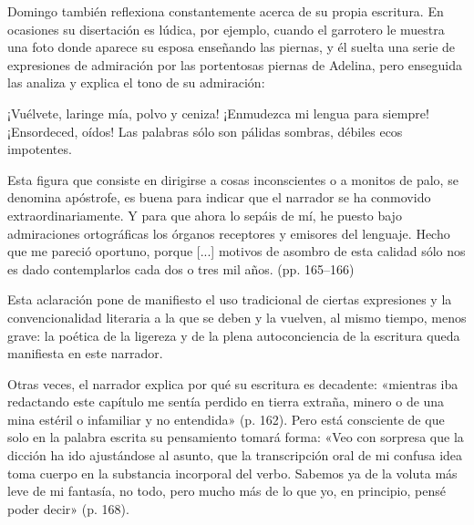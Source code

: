 \documentclass[14pt,twoside,final]{extbook} %
\begin{document}
Domingo también reflexiona constantemente acerca de su propia escritura. En ocasiones su disertación es lúdica, por ejemplo, cuando el garrotero le muestra una foto donde aparece su esposa enseñando las piernas, y él suelta una serie de expresiones de admiración por las portentosas piernas de Adelina, pero enseguida las analiza y explica el tono de su admiración:
\begin{quoting}
¡Vuélvete, laringe mía, polvo y ceniza! ¡Enmudezca mi lengua para siempre! ¡Ensordeced, oídos! Las palabras sólo son pálidas sombras, débiles ecos impotentes.

Esta figura que consiste en dirigirse a cosas inconscientes o a monitos de palo, se denomina apóstrofe, es buena para indicar que el narrador se ha conmovido extraordinariamente. Y para que ahora lo sepáis de mí, he puesto bajo admiraciones ortográficas los órganos receptores y emisores del lenguaje. Hecho que me pareció oportuno, porque [...] motivos de asombro de esta calidad sólo nos es dado contemplarlos cada dos o tres mil años. (pp. 165--166)
\end{quoting}
Esta aclaración pone de manifiesto el uso tradicional de ciertas expresiones y la convencionalidad literaria a la que se deben y la vuelven, al mismo tiempo, menos grave: la poética de la ligereza y de la plena autoconciencia de la escritura queda manifiesta en este narrador.

Otras veces, el narrador explica por qué su escritura es decadente: «mientras iba redactando este capítulo me sentía perdido en tierra extraña, minero o de una mina estéril o infamiliar y no entendida» (p. 162). Pero está consciente de que solo en la palabra escrita su pensamiento tomará forma: «Veo con sorpresa que la dicción ha ido ajustándose al asunto, que la transcripción oral de mi confusa idea toma cuerpo en la substancia incorporal del verbo. Sabemos ya de la voluta más leve de mi fantasía, no todo, pero mucho más de lo que yo, en principio, pensé poder decir» (p. 168).
\end{document}
